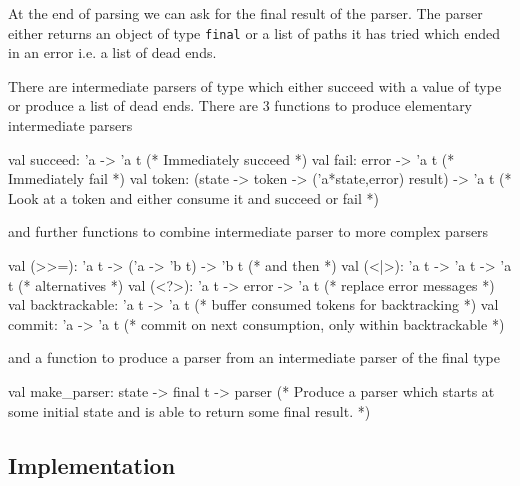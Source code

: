 At the end of parsing we can ask for the final result of the parser. The
parser either returns an object of type \verb!final! or a list of paths it has
tried which ended in an error i.e. a list of dead ends.

There are intermediate parsers of type  which either succeed with a
value of type  or produce a list of dead ends. There are 3 functions
to produce elementary intermediate parsers
%
\begin{ocaml}
  val succeed: 'a -> 'a t            (* Immediately succeed *)
  val fail:    error -> 'a t         (* Immediately fail    *)
  val token:   (state -> token -> ('a*state,error) result) -> 'a t
            (* Look at a token and either consume it and succeed or fail *)
\end{ocaml}
%
and further functions to combine intermediate parser to more complex parsers
%
\begin{ocaml}
  val (>>=): 'a t -> ('a -> 'b t) -> 'b t  (* and then     *)
  val (<|>): 'a t -> 'a t -> 'a t          (* alternatives *)
  val (<?>): 'a t -> error -> 'a t         (* replace error messages *)
  val backtrackable: 'a t -> 'a t          (* buffer consumed tokens for backtracking *)
  val commit: 'a -> 'a t                   (* commit on next consumption,
                                              only within backtrackable *)
\end{ocaml}
%
and a function to produce a parser from an intermediate parser of the final
type
%
\begin{ocaml}
  val make_parser: state -> final t -> parser
  (* Produce a parser which starts at some initial state and is able to
     return some final result. *)
\end{ocaml}


\subsection{Implementation}

